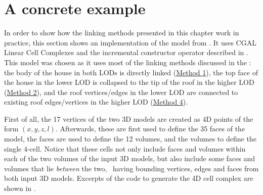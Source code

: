 \section{A concrete example}
\label{se:concrete-example}

In order to show how the linking methods presented in this chapter work in practice, this section shows an implementation of the model from .
It uses CGAL Linear Cell Complexes and the incremental constructor operator described in .
This model was chosen as it uses most of the linking methods discussed in the : 
the body of the house in both LODs is directly linked (\hyperref[sss:method1]{Method 1}), 
the top face of the house in the lower LOD is collapsed to the tip of the roof in the higher LOD (\hyperref[sss:method2]{Method 2}), 
and the roof vertices/edges in the lower LOD are connected to existing roof edges/vertices in the higher LOD (\hyperref[sss:method4]{Method 4}).

First of all, the 17 vertices of the two 3D models are created as 4D points of the form $(x, y, z, l)$.
Afterwards, these are first used to define the 35 faces of the model, the faces are used to define the 12 volumes, and the volumes to define the single 4-cell.
Notice that these cells not only include faces and volumes within each of the two volumes of the input 3D models, but also include some faces and volumes that lie \emph{between} the two, \ie\ having bounding vertices, edges and faces from both input 3D models.
Excerpts of the code to generate the 4D cell complex are shown in .
\newsavebox{\pointsbox}
\begin{lrbox}{\pointsbox}
\begin{minipage}{0.42\overflowingheadlen}

\end{minipage}
\end{lrbox}

\newsavebox{\constructionbox}
\begin{lrbox}{\constructionbox}
\begin{minipage}{0.5\overflowingheadlen}

\end{minipage}
\end{lrbox}

